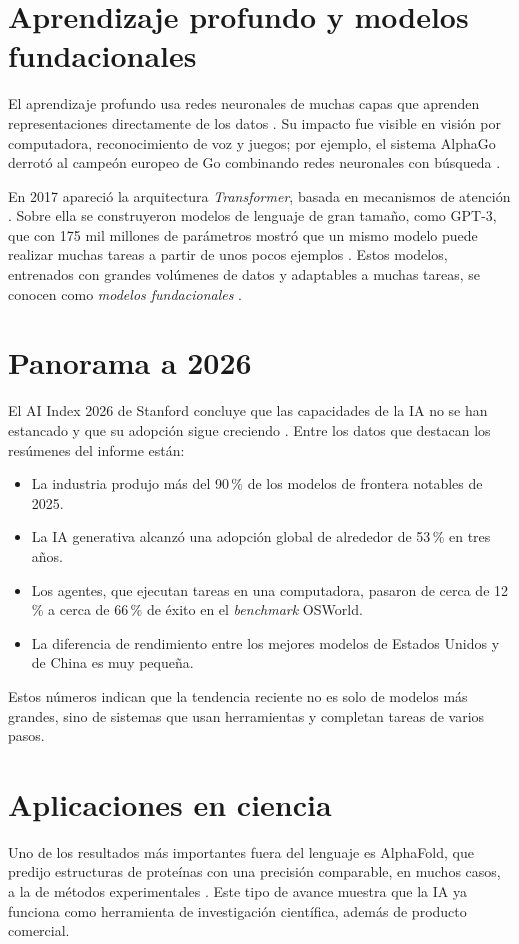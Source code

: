 \documentclass[11pt,a4paper]{article}
\begin{document}
\section{Aprendizaje profundo y modelos fundacionales}
El aprendizaje profundo usa redes neuronales de muchas capas que aprenden representaciones directamente de los datos \cite{lecun2015}. Su impacto fue visible en visión por computadora, reconocimiento de voz y juegos; por ejemplo, el sistema AlphaGo derrotó al campeón europeo de Go combinando redes neuronales con búsqueda \cite{silver2016}.

En 2017 apareció la arquitectura \emph{Transformer}, basada en mecanismos de atención \cite{vaswani2017}. Sobre ella se construyeron modelos de lenguaje de gran tamaño, como GPT-3, que con 175 mil millones de parámetros mostró que un mismo modelo puede realizar muchas tareas a partir de unos pocos ejemplos \cite{brown2020}. Estos modelos, entrenados con grandes volúmenes de datos y adaptables a muchas tareas, se conocen como \emph{modelos fundacionales} \cite{bommasani2021}.

\section{Panorama a 2026}
El AI Index 2026 de Stanford concluye que las capacidades de la IA no se han estancado y que su adopción sigue creciendo \cite{aiindex2026}. Entre los datos que destacan los resúmenes del informe están:
\begin{itemize}
  \item La industria produjo más del 90\,\% de los modelos de frontera notables de 2025.
  \item La IA generativa alcanzó una adopción global de alrededor de 53\,\% en tres años.
  \item Los agentes, que ejecutan tareas en una computadora, pasaron de cerca de 12\,\% a cerca de 66\,\% de éxito en el \emph{benchmark} OSWorld.
  \item La diferencia de rendimiento entre los mejores modelos de Estados Unidos y de China es muy pequeña.
\end{itemize}
Estos números indican que la tendencia reciente no es solo de modelos más grandes, sino de sistemas que usan herramientas y completan tareas de varios pasos.

\section{Aplicaciones en ciencia}
Uno de los resultados más importantes fuera del lenguaje es AlphaFold, que predijo estructuras de proteínas con una precisión comparable, en muchos casos, a la de métodos experimentales \cite{jumper2021}. Este tipo de avance muestra que la IA ya funciona como herramienta de investigación científica, además de producto comercial.
\end{document}

